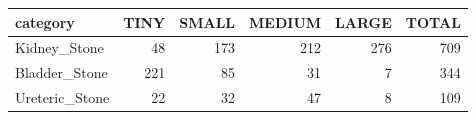 \begin{tabular}{lrrrrr}
\toprule
category & TINY & SMALL & MEDIUM & LARGE & TOTAL \\
\midrule
Kidney_Stone & 48 & 173 & 212 & 276 & 709 \\
Bladder_Stone & 221 & 85 & 31 & 7 & 344 \\
Ureteric_Stone & 22 & 32 & 47 & 8 & 109 \\
\bottomrule
\end{tabular}
